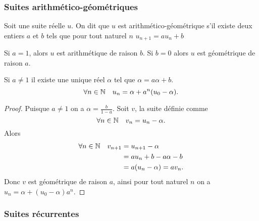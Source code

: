 \subsubsection{Suites arithmético-géométriques}

\begin{defdef}
  Soit une suite réelle \(u\). On dit que \(u\) est arithmético-géométrique s'il existe deux entiers \(a\) et \(b\) tels que pour tout naturel \(n\) \(u_{n+1}=au_n +b\)
\end{defdef}

Si \(a=1\), alors \(u\) est arithmétique de raison \(b\). Si \(b=0\) alors \(u\) est géométrique de raison \(a\).

\begin{prop}
  Si \(a\neq 1\) il existe une unique réel \(\alpha\) tel que \(\alpha=a\alpha+b\). %
  \begin{equation}
    \forall n \in \mathbb{N} \quad u_n=\alpha + a^{n}(u_0-\alpha).
  \end{equation}
\end{prop}
\begin{proof}
  Puisque \(a \neq 1\) on a \(\alpha = \frac{b}{1-a}\). Soit \(v\), la suite définie comme
  \begin{equation}
    \forall n \in \mathbb{N} \quad v_n = u_n -\alpha.
  \end{equation}
Alors
\begin{align}
  \forall n \in \mathbb{N} \quad v_{n+1}&=u_{n+1}-\alpha \\
  &= a u_n +b - a\alpha -b \\
  &= a(u_n-\alpha)=a v_n.
\end{align}
Donc \(v\) est géométrique de raison \(a\), ainsi pour tout naturel \(n\) on a \(u_n=\alpha + (u_0-\alpha)a^n\).
\end{proof}

\subsubsection{Suites récurrentes}

